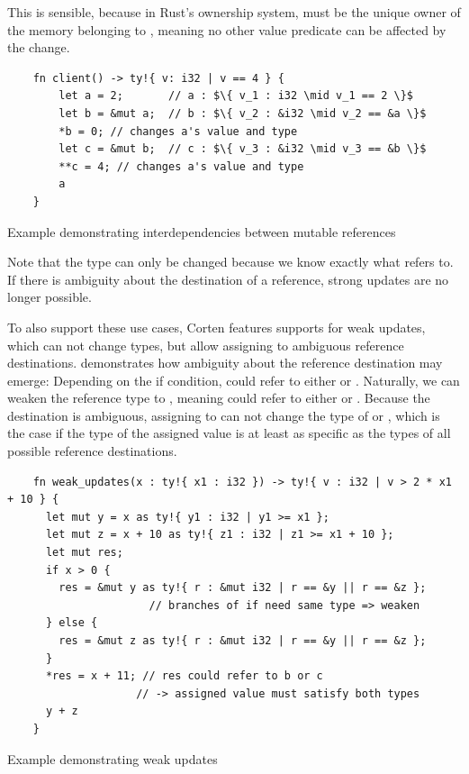 \documentclass[twoside, english]{sdqthesis}
\theoremstyle{definition}
\begin{document}
This is sensible, because in Rust's ownership system,  must be the unique owner of the memory belonging to , meaning no other value predicate can be affected by the change.

\begin{listing}[h]
  \begin{verbatim}
    fn client() -> ty!{ v: i32 | v == 4 } {
        let a = 2;       // a : $\{ v_1 : i32 \mid v_1 == 2 \}$
        let b = &mut a;  // b : $\{ v_2 : &i32 \mid v_2 == &a \}$
        *b = 0; // changes a's value and type
        let c = &mut b;  // c : $\{ v_3 : &i32 \mid v_3 == &b \}$
        **c = 4; // changes a's value and type
        a
    }
  \end{verbatim}
  \caption{Example demonstrating interdependencies between mutable references}
  \label{lst:mutation-strong}
\end{listing}

Note that the type can only be changed because we know exactly what  refers to. If there is ambiguity about the destination of a reference, strong updates are no longer possible.

To also support these use cases, Corten features supports for weak updates, which can not change types, but allow assigning to ambiguous reference destinations.
 demonstrates how ambiguity about the reference destination may emerge: Depending on the if condition,  could refer to either  or .
Naturally, we can weaken the reference type to , meaning  could refer to either  or .
Because the destination is ambiguous, assigning to  can not change the type of  or , which is the case if the type of the assigned value is at least as specific as the types of all possible reference destinations.

\begin{listing}[h]
  \begin{verbatim}
    fn weak_updates(x : ty!{ x1 : i32 }) -> ty!{ v : i32 | v > 2 * x1 + 10 } {
      let mut y = x as ty!{ y1 : i32 | y1 >= x1 };
      let mut z = x + 10 as ty!{ z1 : i32 | z1 >= x1 + 10 };
      let mut res;
      if x > 0 {
        res = &mut y as ty!{ r : &mut i32 | r == &y || r == &z };
                      // branches of if need same type => weaken
      } else {
        res = &mut z as ty!{ r : &mut i32 | r == &y || r == &z };
      }
      *res = x + 11; // res could refer to b or c 
                    // -> assigned value must satisfy both types
      y + z
    }
  \end{verbatim}
  \caption{Example demonstrating weak updates}
  \label{lst:mutation-weak}
\end{listing}
\end{document}
